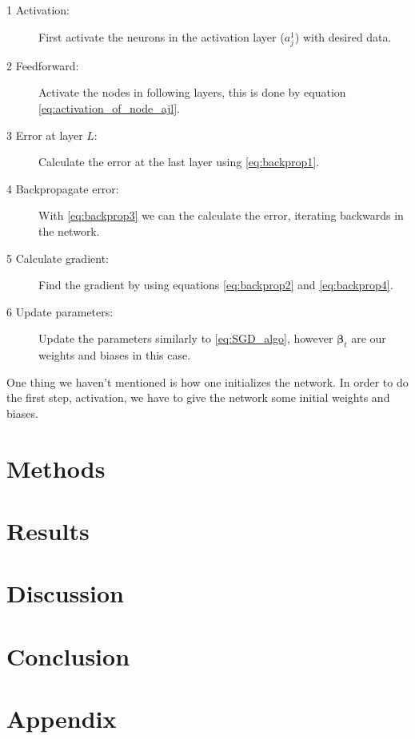 \documentclass[12pt]{extarticle}
\begin{document}
\begin{description}
	\item[1 Activation:] First activate the neurons in the activation layer ($a^1_j$) with desired data.
	\item[2 Feedforward:] Activate the nodes in following layers, this is done by equation \eqref{eq:activation_of_node_ajl}.
	\item[3 Error at layer $L$:] Calculate the error at the last layer using \eqref{eq:backprop1}.
	\item[4 Backpropagate error:] With \eqref{eq:backprop3} we can the calculate the error, iterating backwards in the network.
	\item[5 Calculate gradient:] Find the gradient by using equations \eqref{eq:backprop2} and \eqref{eq:backprop4}.
	\item[6 Update parameters:] Update the parameters similarly to \eqref{eq:SGD_algo}, however $\boldsymbol{\beta}_t$ are our weights and biases in this case.
\end{description}
One thing we haven't mentioned is how one initializes the network. In order to do the first step, activation, we have to give the network some initial weights and biases. 


\section{Methods}
\section{Results}
\section{Discussion}
\section{Conclusion}
\appendix
\section{Appendix}


\end{document}

